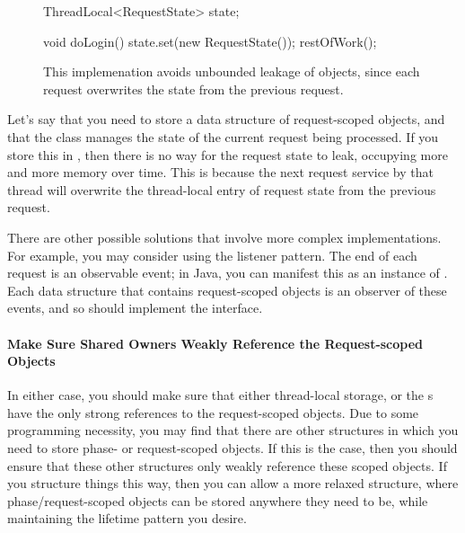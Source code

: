 \begin{figure}
\centering
\begin{framedlisting}
ThreadLocal<RequestState> state;

void doLogin() {
  state.set(new RequestState());
  restOfWork();
}
\end{framedlisting}
\caption{This implemenation avoids unbounded leakage of 
objects, since each request overwrites the state from the previous request.}
\end{figure}
Let's say that you need to store a data structure of request-scoped objects,
and that the class  manages the state of the current
request being processed. If you store this in \tls, then there is no way for the
request state to leak, occupying more and more memory over time. This is because
the next request service by that thread will overwrite the thread-local entry of
request state from the previous request.

There are other possible solutions that involve more complex implementations. 
For example, you may consider using the listener pattern. The end of each
request is an observable event; in Java, you can manifest this as an instance of
. Each data structure that contains request-scoped objects is
an observer of these events, and so should implement the 
interface. 

\paragraph{Make Sure Shared Owners Weakly Reference the Request-scoped Objects}
In either case, you should make sure that either thread-local storage, or the
s have the only strong references to the request-scoped objects.
Due to some programming necessity, you may find that there are other structures
in which you need to store phase- or request-scoped objects. If this is the
case, then you should ensure that these other structures only weakly reference
these scoped objects. If you structure things this way, then you can allow a
more relaxed structure, where phase/request-scoped objects can be stored
anywhere they need to be, while maintaining the lifetime pattern you desire.
 

